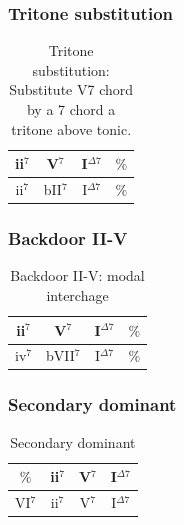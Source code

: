\documentclass{article}
\begin{document}
\subsubsection{Tritone substitution}
\begin{table}[!h]
	\caption{Tritone substitution: Substitute V7 chord by a 7 chord a tritone above tonic.}
	\centering
	\begin{tabular}{| c | c | c | c |}
		\hline
		\phantom{x}ii$^7$\phantom{x} & \phantom{x}V$^7$\phantom{x} & \phantom{x}I$^{\Delta 7}$\phantom{x}  & \phantom{x}$\%$\phantom{x} \\
		\hline
		\phantom{x}ii$^7$\phantom{x} & \phantom{x}bII$^7$\phantom{x} & \phantom{x}I$^{\Delta 7}$\phantom{x}  & \phantom{x}$\%$\phantom{x} \\
		\hline
	\end{tabular}
	\label{tab:tritone-subs }
\end{table}

\subsubsection{Backdoor II-V}
\begin{table}[!h]
	\caption{Backdoor II-V: modal interchage}
	\centering
	\begin{tabular}{| c | c | c | c |}
		\hline
		\phantom{x}ii$^7$\phantom{x} & \phantom{x}V$^7$\phantom{x} & \phantom{x}I$^{\Delta 7}$\phantom{x}  & \phantom{x}$\%$\phantom{x} \\
		\hline
		\phantom{x}iv$^7$\phantom{x} & \phantom{x}bVII$^7$\phantom{x} & \phantom{x}I$^{\Delta 7}$\phantom{x}  & \phantom{x}$\%$\phantom{x} \\
		\hline
	\end{tabular}
	\label{tab: }
\end{table}

\subsubsection{Secondary dominant}
\begin{table}[!h]
	\caption{Secondary dominant}
	\centering
	\begin{tabular}{| c | c | c | c |}
		\hline
		 \phantom{x}$\%$\phantom{x} & \phantom{x}ii$^7$\phantom{x} & \phantom{x}V$^7$\phantom{x} & \phantom{x}I$^{\Delta 7}$\phantom{x}   \\
		\hline
		\phantom{x}VI$^7$\phantom{x} & \phantom{x}ii$^7$\phantom{x} &  \phantom{x}V$^{7}$\phantom{x}  & \phantom{x}I$^{\Delta 7}$\phantom{x} \\
		\hline
	\end{tabular}
	\label{tab: }
\end{table}
\end{document}
